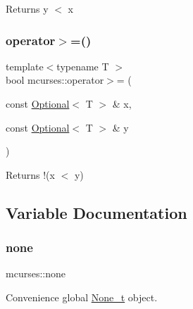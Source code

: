 \begin{DoxyReturn}{Returns}
y $<$ x 
\end{DoxyReturn}
\hypertarget{namespacemcurses_a06a31f499cdd2fb20afdb35325498d90}{}\label{namespacemcurses_a06a31f499cdd2fb20afdb35325498d90} 
\subsubsection{\texorpdfstring{operator$>$=()}{operator>=()}}
{\footnotesize\ttfamily template$<$typename T $>$ \\
bool mcurses\+::operator$>$= (\begin{DoxyParamCaption}\item[{const \hyperlink{classmcurses_1_1Optional}{Optional}$<$ T $>$ \&}]{x,  }\item[{const \hyperlink{classmcurses_1_1Optional}{Optional}$<$ T $>$ \&}]{y }\end{DoxyParamCaption})}

\begin{DoxyReturn}{Returns}
!(x $<$ y) 
\end{DoxyReturn}


\subsection{Variable Documentation}
\hypertarget{namespacemcurses_a3fd18c73e6d453dcdfdd1fcdaf9bb0d7}{}\label{namespacemcurses_a3fd18c73e6d453dcdfdd1fcdaf9bb0d7} 
\subsubsection{\texorpdfstring{none}{none}}
{\footnotesize\ttfamily mcurses\+::none}

Convenience global \hyperlink{classmcurses_1_1None__t}{None\+\_\+t} object. 